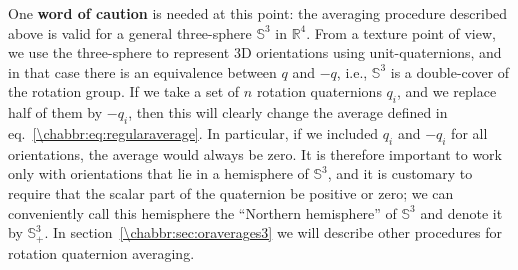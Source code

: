 One \textbf{word of caution} is needed at this point: the averaging procedure described above is valid for a general three-sphere $\mathbb{S}^3$ in $\mathbb{R}^4$. From a texture point of view, we use the three-sphere to represent 3D orientations using unit-quaternions, and in that case there is an equivalence between $q$ and $-q$, i.e., $\mathbb{S}^3$ is a double-cover of the rotation group. If we take a set of $n$ rotation quaternions $q_i$, and we replace half of them by $-q_i$, then this will clearly change the average defined in eq.~\ref{\chabbr:eq:regularaverage}.  In particular, if we included $q_i$ and $-q_i$ for all orientations, the average would always be zero.  It is therefore important to work only with orientations that lie in a hemisphere of $\mathbb{S}^3$, and it is customary to require that the scalar part of the quaternion be positive or zero; we can conveniently call this hemisphere the ``Northern hemisphere'' of $\mathbb{S}^3$ and denote it by $\mathbb{S}^3_+$.  In section~\ref{\chabbr:sec:oraverages3} we will describe other procedures for rotation quaternion averaging.

